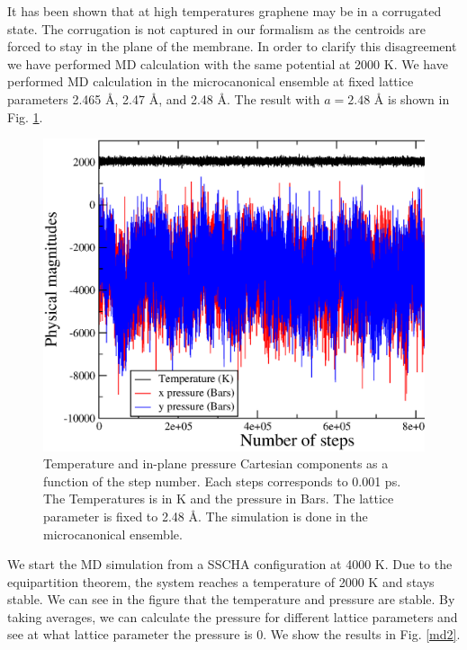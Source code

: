 It has been shown that at high temperatures graphene may be in a corrugated 
state\cite{pozzo2011thermal,los2009scaling}. The corrugation is not captured in our formalism as the centroids are 
forced to stay in the plane of the membrane. In order to clarify this disagreement we have performed MD calculation 
with the same potential at 2000 K. We have performed MD calculation in the microcanonical ensemble at fixed lattice 
parameters 2.465 \AA, 2.47 \AA, and 2.48 \AA. The result with $a=2.48$ \AA \hspace{0.1cm} is shown in Fig. \ref{md1}.
\begin{figure}[ht]
\includegraphics[width=0.99\linewidth]{Figures/md1.eps}
\caption[Molecular dynamics run.]{Temperature and in-plane pressure Cartesian components as a function of
the step number. Each steps corresponds to 0.001 ps. The Temperatures is in K and the pressure in Bars. The lattice 
parameter is fixed to 2.48 \AA. The simulation is done in the microcanonical ensemble.}
\label{md1}
\end{figure}
We start the MD simulation from a SSCHA configuration at 4000 K. Due to the equipartition theorem, the system reaches
a temperature of 2000 K and stays stable. We can see in the figure that the temperature and pressure are stable. By 
taking averages, we can calculate the pressure for different lattice parameters and see at what lattice parameter 
the pressure is 0. We show the results in Fig. \ref{md2}. 
